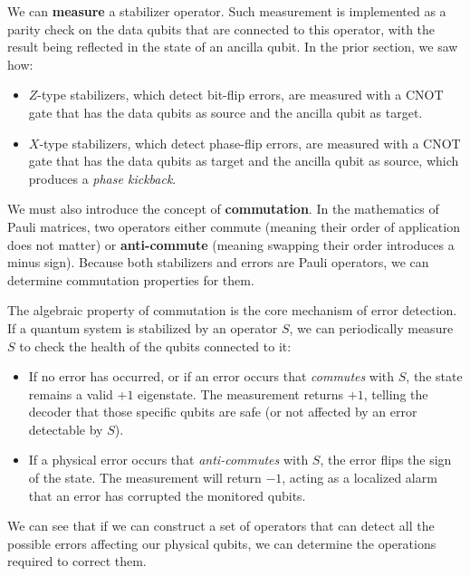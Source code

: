 We can \textbf{measure} a stabilizer operator. Such measurement is implemented as a parity check on the data qubits that are connected to this operator, with the result being reflected in the state of an ancilla qubit. In the prior section, we saw how:
\begin{itemize}
    \item $Z$-type stabilizers, which detect bit-flip errors, are measured with a $\text{CNOT}$ gate that has the data qubits as source and the ancilla qubit as target.
    \item $X$-type stabilizers, which detect phase-flip errors, are measured with a $\text{CNOT}$ gate that has the data qubits as target and the ancilla qubit as source, which produces a \textit{phase kickback}.
\end{itemize}

We must also introduce the concept of \textbf{commutation}. In the mathematics of Pauli matrices, two operators either commute (meaning their order of application does not matter) or \textbf{anti-commute} (meaning swapping their order introduces a minus sign). Because both stabilizers and errors are Pauli operators, we can determine commutation properties for them.

The algebraic property of commutation is the core mechanism of error detection. If a quantum system is stabilized by an operator $S$, we can periodically measure $S$ to check the health of the qubits connected to it:
\begin{itemize}
    \item If no error has occurred, or if an error occurs that \textit{commutes} with $S$, the state remains a valid $+1$ eigenstate. The measurement returns $+1$, telling the decoder that those specific qubits are safe (or not affected by an error detectable by $S$).
    \item If a physical error occurs that \textit{anti-commutes} with $S$, the error flips the sign of the state. The measurement will return $-1$, acting as a localized alarm that an error has corrupted the monitored qubits.
\end{itemize}

We can see that if we can construct a set of operators that can detect all the possible errors affecting our physical qubits, we can determine the operations required to correct them.

